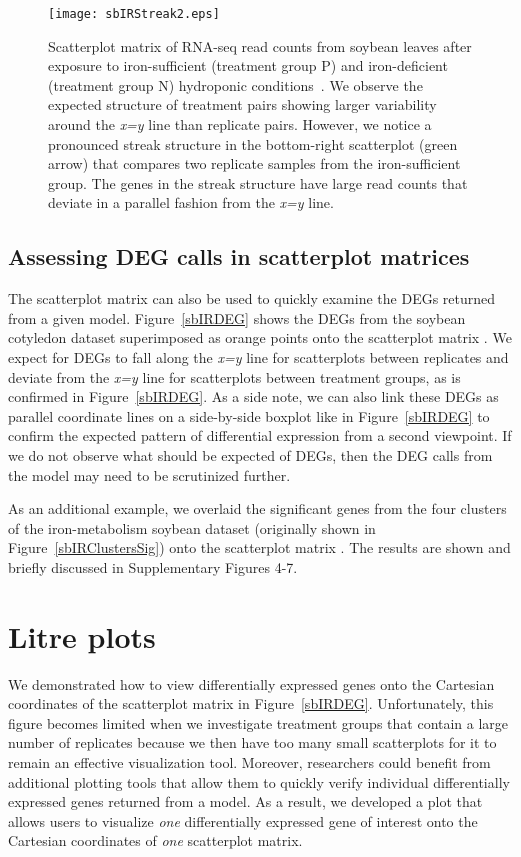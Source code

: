 \documentclass{bioinfo}
\begin{document}
\begin{figure}
\texttt{[image: sbIRStreak2.eps]}
\caption{Scatterplot matrix of RNA-seq read counts from soybean leaves after exposure to iron-sufficient (treatment group P) and iron-deficient (treatment group N) hydroponic conditions~\citep{Lauter16}. We observe the expected structure of treatment pairs showing larger variability around the \textit{x=y} line than replicate pairs. However, we notice a pronounced streak structure in the bottom-right scatterplot (green arrow) that compares two replicate samples from the iron-sufficient group. The genes in the streak structure have large read counts that deviate in a parallel fashion from the \textit{x=y} line.
\label{structure}}
\end{figure}

\subsection{Assessing DEG calls in scatterplot matrices}

The scatterplot matrix can also be used to quickly examine the DEGs returned from a given model. Figure~\ref{sbIRDEG} shows the DEGs from the soybean cotyledon dataset superimposed as orange points onto the scatterplot matrix \citep{Brown}. We expect for DEGs to fall along the \textit{x=y} line for scatterplots between replicates and deviate from the \textit{x=y} line for scatterplots between treatment groups, as is confirmed in Figure~\ref{sbIRDEG}. As a side note, we can also link these DEGs as parallel coordinate lines on a side-by-side boxplot like in Figure~\ref{sbIRDEG} to confirm the expected pattern of differential expression from a second viewpoint. If we do not observe what should be expected of DEGs, then the DEG calls from the model may need to be scrutinized further.

As an additional example, we overlaid the significant genes from the four clusters of the iron-metabolism soybean dataset (originally shown in Figure~\ref{sbIRClustersSig}) onto the scatterplot matrix \citep{Lauter16}. The results are shown and briefly discussed in Supplementary Figures 4-7.

\section{Litre plots}

We demonstrated how to view differentially expressed genes onto the Cartesian coordinates of the scatterplot matrix in Figure~\ref{sbIRDEG}. Unfortunately, this figure becomes limited when we investigate treatment groups that contain a large number of replicates because we then have too many small scatterplots for it to remain an effective visualization tool. Moreover, researchers could benefit from additional plotting tools that allow them to quickly verify individual differentially expressed genes returned from a model. As a result, we developed a plot that allows users to visualize \textit{one} differentially expressed gene of interest onto the Cartesian coordinates of \textit{one} scatterplot matrix.
\end{document}
